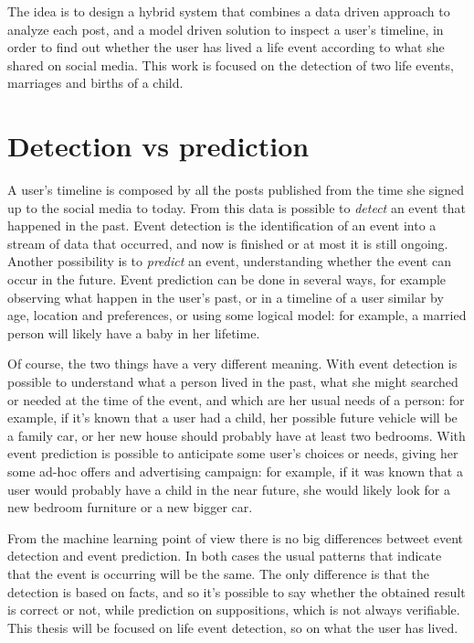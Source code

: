 The idea is to design a hybrid system that combines a data driven approach to analyze each post, and a model driven solution to inspect a user's timeline, in order to find out whether the user has lived a life event according to what she shared on social media. This work is focused on the detection of two life events, marriages and births of a child.

\section{Detection vs prediction}

A user's timeline is composed by all the posts published from the time she signed up to the social media to today. From this data is possible to \emph{detect} an event that happened in the past. Event detection is the identification of an event into a stream of data that occurred, and now is finished or at most it is still ongoing. Another possibility is to \emph{predict} an event, understanding whether the event can occur in the future. Event prediction can be done in several ways, for example observing what happen in the user's past, or in a timeline of a user similar by age, location and preferences, or using some logical model: for example, a married person will likely have a baby in her lifetime.

Of course, the two things have a very different meaning. With event detection is possible to understand what a person lived in the past, what she might searched or needed at the time of the event, and which are her usual needs of a person: for example, if it's known that a user had a child, her possible future vehicle will be a family car, or her new house should probably have at least two bedrooms. With event prediction is possible to anticipate some user's choices or needs, giving her some ad-hoc offers and advertising campaign: for example, if it was known that a user would probably have a child in the near future, she would likely look for a new bedroom furniture or a new bigger car.

From the machine learning point of view there is no big differences betweet event detection and event prediction. In both cases the usual patterns that indicate that the event is occurring will be the same. The only difference is that the detection is based on facts, and so it's possible to say whether the obtained result is correct or not, while prediction on suppositions, which is not always verifiable. This thesis will be focused on life event detection, so on what the user has lived.

